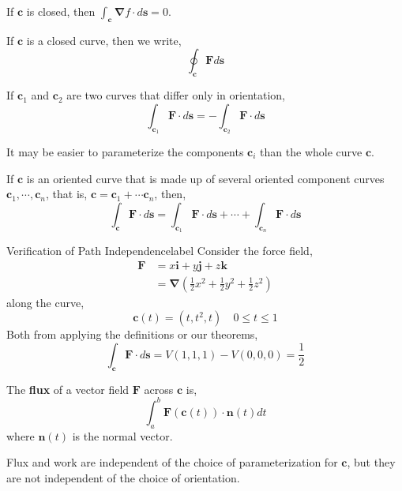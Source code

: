 \begin{cor}
	If $\mathbf{c}$ is closed, then $\int_{\mathbf{c}} \mathbf{\nabla} f \cdot d \mathbf{s}=0$.
\end{cor}

\begin{marginfigure}
	If $\mathbf{c}$ is a closed curve, then we write,
	\[\oint_{\mathbf{c}} \mathbf{F} d \mathbf{s}\]
\end{marginfigure}

\begin{rmk}
	If $\mathbf{c}_1$ and $\mathbf{c}_2$ are two curves that differ only in orientation,
	\[\int_{\mathbf{c}_1} \mathbf{F} \cdot d \mathbf{s} = -\int_{\mathbf{c}_2} \mathbf{F} \cdot d \mathbf{s}\]
\end{rmk}

\begin{marginfigure}
	It may be easier to parameterize the components $\mathbf{c}_i$ than the whole curve $\mathbf{c}$.
\end{marginfigure}

\begin{rmk}
	If $\mathbf{c}$ is an oriented curve that is made up of several oriented component curves $\mathbf{c}_1, \cdots, \mathbf{c}_n$, that is, $\mathbf{c} = \mathbf{c}_1 + \cdots \mathbf{c}_n$, then,
	\[\int_{\mathbf{c}} \mathbf{F} \cdot d \mathbf{s} = \int_{\mathbf{c}_1} \mathbf{F} \cdot d \mathbf{s} + \cdots + \int_{\mathbf{c}_n} \mathbf{F} \cdot d \mathbf{s}\]
\end{rmk}

\begin{ex}{Verification of Path Independence}{label}
	Consider the force field,
	\begin{align*}
		\mathbf{F}&=x \mathbf{i}+y \mathbf{j}+z \mathbf{k} \\
		&= \mathbf{\nabla}\left(\frac{1}{2} x^2+\frac{1}{2} y^2+\frac{1}{2} z^2\right)
	\end{align*}
	along the curve,
	\[\mathbf{c}(t)=\left(t, t^2, t\right) \quad 0 \leq t \leq 1\]
	Both from applying the definitions or our theorems,
	\[\int_{\mathbf{c}} \mathbf{F} \cdot d \mathbf{s}=V(1,1,1)-V(0,0,0) = \frac{1}{2}\]
\end{ex}

\begin{defn}[Flux]
	The \textbf{flux} of a vector field $\mathbf{F}$ across $\mathbf{c}$ is,
	\[\int_a^b \mathbf{F}(\mathbf{c}(t)) \cdot \mathbf{n}(t) d t\]
	where $\mathbf{n}(t)$ is the normal vector.
\end{defn}

\begin{marginfigure}
	Flux and work are independent of the choice of parameterization for $\mathbf{c}$, but they are not independent of the choice of orientation.
\end{marginfigure}
